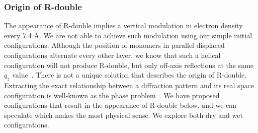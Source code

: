 \documentclass[journal=jpcbfk,manuscript=article]{achemso}
\begin{document}
  \subsubsection{Origin of R-double}\label{section:rdouble}
  
  
  The appearance of R-double implies a vertical modulation in electron density every 7.4 \AA.
  We are not able to achieve such modulation using our simple initial configurations. Although
  the position of monomers in parallel displaced configurations alternate every other layer, 
  we know that such a helical configuration will not produce R-double, but only off-axis 
  reflections at the same $q_z$ value~\cite{harburn_atlas_1975}. There is not a unique solution
  that describes the origin of R-double. Extracting the exact relationship between a diffraction
  pattern and its real space configuration is well-known as the phase problem~\cite{taylor_phase_2003}.    
  We have proposed configurations that result in the appearance of R-double below, and we can 
  speculate which makes the most physical sense. We explore both dry and wet configurations.
 
\end{document}
